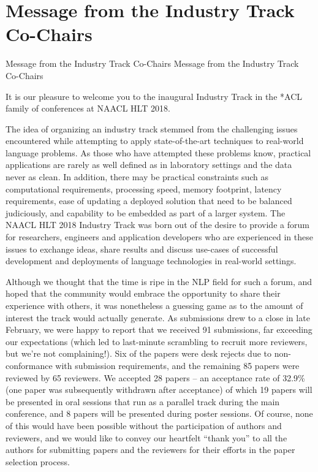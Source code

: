 \vspace{2em}

\section{Message from the Industry Track Co-Chairs}\vspace{2em}
\setheaders%
    {Message from the Industry Track Co-Chairs}%
    {Message from the Industry Track Co-Chairs}
\thispagestyle{emptyheader}

\setlength{\parskip}{1ex}

It is our pleasure to welcome you to the inaugural Industry Track in the *ACL family of conferences at NAACL HLT 2018. 

The idea of organizing an industry track stemmed from the challenging issues encountered while attempting to apply state-of-the-art techniques to real-world language problems. As those who have attempted these problems know, practical applications are rarely as well defined as in laboratory settings and the data never as clean. In addition, there may be practical constraints such as computational requirements, processing speed, memory footprint, latency requirements, ease of updating a deployed solution that need to be balanced judiciously, and capability to be embedded as part of a larger system. The NAACL HLT 2018 Industry Track was born out of the desire to provide a forum for researchers, engineers and application developers who are experienced in these issues to exchange ideas, share results and discuss use-cases of successful development and deployments of language technologies in real-world settings. 

Although we thought that the time is ripe in the NLP field for such a forum, and hoped that the community would embrace the opportunity to share their experience with others, it was nonetheless a guessing game as to the amount of interest the track would actually generate. As submissions drew to a close in late February, we were happy to report that we received 91 submissions, far exceeding our expectations (which led to last-minute scrambling to recruit more reviewers, but we're not complaining!). Six of the papers were desk rejects due to non-conformance with submission requirements, and the remaining 85 papers were reviewed by 65 reviewers. We accepted 28 papers -- an acceptance rate of 32.9\% (one paper was subsequently withdrawn after acceptance) of which 19 papers will be presented in oral sessions that run as a parallel track during the main conference, and 8 papers will be presented during poster sessions. Of course, none of this would have been possible without the participation of authors and reviewers, and we would like to convey our heartfelt ``thank you'' to all the authors for submitting papers and the reviewers for their efforts in the paper selection process.

